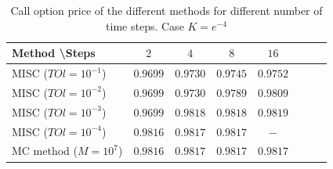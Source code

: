 \documentclass[11pt]{article}
\begin{document}
%




\begin{table}[h!]
	\centering
	\begin{tabular}{l*{6}{c}r}
		Method \textbackslash  Steps            & $2$ & $4$ & $8$ & $16$  \\
		\hline
		MISC ($TOl=10^{-1}$)  & $0.9699$ & $0.9730$  &  $0.9745$  &  $0.9752$ \\
		MISC ($TOl=10^{-2}$)  & $0.9699$ & $0.9730$  &  $0.9789$  &  $0.9809$ \\
		MISC ($TOl=10^{-3}$)         & $0.9699$ & $0.9818$  &  $0.9818$  &  $0.9819$ \\
		MISC ($TOl=10^{-4}$)     & $0.9816$ & $0.9817$  &  $0.9817$  &  $-$ \\
		MC method ($M=10^{7}$)   & $0.9816$ & $0.9817$  &  $0.9817$  &   $0.9817$ \\	
		\hline
	\end{tabular}
	\caption{ Call option price of the different methods for different number of time steps. Case $K=e^{-4}$}
	\label{table: Call option price of the different methods for different number of time steps. Case $K=e^{-4}$}
\end{table}
\end{document}
